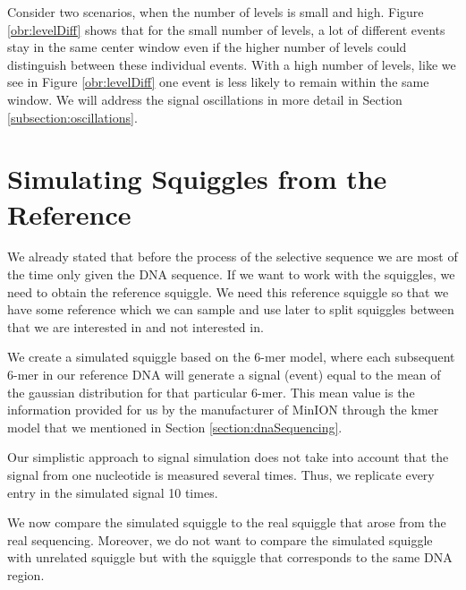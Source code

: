Consider two scenarios, when the number of levels is small and high.
Figure \ref{obr:levelDiff} shows that for the small number of levels, a lot of
different events stay in the same center window even if the higher number of levels
could distinguish between these individual events. With a high number of levels,
like we see in Figure \ref{obr:levelDiff} one event is less likely to remain within the same window.
We will address the signal oscillations in more detail in Section \ref{subsection:oscillations}.

\section{Simulating Squiggles from the Reference}

We already stated that before the process of the selective sequence we are most
of the time only given the DNA sequence. If we want to work with the squiggles,
we need to obtain the reference squiggle. We need this reference squiggle
so that we have some reference which we can sample and use later to split squiggles
between that we are interested in and not interested in.

We create a simulated squiggle based on the 6-mer model,
where each subsequent 6-mer in our reference DNA will generate a signal (event) equal to
the mean of the gaussian distribution for that particular 6-mer. This mean value
is the information provided for us by the manufacturer of MinION through the kmer model
that we mentioned in Section \ref{section:dnaSequencing}.

Our simplistic approach to signal simulation does not take into account that the
signal from one nucleotide is measured several times. Thus, we replicate every entry in the simulated signal
10 times.

We now compare the simulated squiggle to the real squiggle that arose from the real
sequencing. Moreover, we do not want to compare the simulated squiggle with unrelated squiggle
but with the squiggle that corresponds to the same DNA region.

